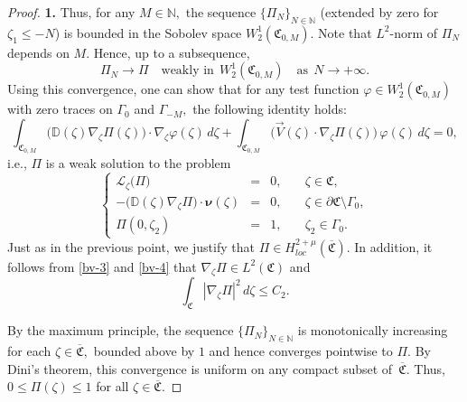 \documentclass[reqno]{amsart}            %
\numberwithin{equation}{section}
\begin{document}
\begin{proof}{\bf 1.}
		Thus, for any $M\in \mathbb{N},$ the sequence $\{\Pi_N\}_{N\in \mathbb{N}}$ (extended by zero for $\zeta_1 \le - N$) is bounded in 
		the Sobolev space $W_2^1(\mathfrak{C}_{0,M}).$ Note that $L^2$-norm of $\Pi_N$ depends on $M.$ Hence, up to a subsequence,
		\begin{equation}\label{bv-4}
			\Pi_N \longrightarrow \Pi \quad \text{weakly in} \ \ W_2^1(\mathfrak{C}_{0,M}) \quad \text{as} \ \ N \to +\infty.
		\end{equation}
		Using this convergence, one can show that for any test function $\varphi \in W^1_2(\mathfrak{C}_{0,M})$ with zero traces on $\Gamma_0$ and $\Gamma_{-M},$ the following identity holds: 
		\begin{equation}\label{bv-5}
			\int_{\mathfrak{C}_{0,M}}\big(\mathbb{D}(\zeta)\nabla_{\zeta}\Pi(\zeta)\big) \cdot \nabla_{\zeta}\varphi(\zeta)\, d\zeta +
			\int_{\mathfrak{C}_{0,M}}\big(\overrightarrow{V}(\zeta) \cdot \nabla_{\zeta}\Pi(\zeta)\big) \, \varphi(\zeta)\, d\zeta =0,
		\end{equation}
		i.e., $\Pi$ is a weak solution to the problem 
		\begin{equation}\label{bv-6}
			\left\{\begin{array}{rcll}
				\mathcal{L}_{\zeta}\big(\Pi\big)
				& =    & 0,
				& \quad \zeta\in \mathfrak{C},
				\\[2mm]
				-\big(\mathbb{D}(\zeta)\nabla_{\zeta}\Pi\big) \cdot \boldsymbol{\nu}(\zeta) & =
				& 0,
				& \quad \zeta\in \partial\mathfrak{C} \setminus \Gamma_0,
				\\[2mm]
				\Pi(0, {\zeta}_2) & =
				& 1,
				& \quad {\zeta}_2\in \Gamma_0.
			\end{array}\right.
		\end{equation}
		Just as in the previous point, we justify that $\Pi \in H^{2+\mu}_{loc}(\overline{\mathfrak{C}}).$  In addition, it follows from \eqref{bv-3} and \eqref{bv-4} that $\nabla_{\zeta}\Pi \in L^2(\mathfrak{C})$ and 
		\begin{equation}\label{bv-7}
			\int_{\mathfrak{C}}|\nabla_{\zeta}{\Pi}|^2\, d\zeta	\le  C_2 .
		\end{equation}
		
		
		By the maximum principle, the sequence $\{\Pi_N\}_{N\in \mathbb{N}}$ is monotonically increasing for each $\zeta \in \overline{\mathfrak{C}},$ bounded above by $1$ and hence converges pointwise to $\Pi.$ By Dini’s theorem, this convergence is uniform on any compact subset of~$\overline{\mathfrak{C}}.$ Thus, $0 \le \Pi(\zeta) \le 1$ for all $\zeta\in \overline{\mathfrak{C}}.$
		

\end{proof}
\end{document}
